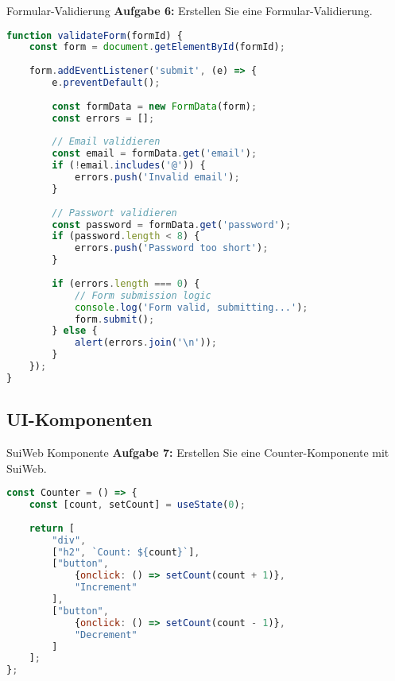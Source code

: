 \begin{example2}{Formular-Validierung}
    \textbf{Aufgabe 6:} Erstellen Sie eine Formular-Validierung.
    \begin{lstlisting}[language=JavaScript, style=basesmol]
function validateForm(formId) {
    const form = document.getElementById(formId);
    
    form.addEventListener('submit', (e) => {
        e.preventDefault();
        
        const formData = new FormData(form);
        const errors = [];
        
        // Email validieren
        const email = formData.get('email');
        if (!email.includes('@')) {
            errors.push('Invalid email');
        }
        
        // Passwort validieren
        const password = formData.get('password');
        if (password.length < 8) {
            errors.push('Password too short');
        }
        
        if (errors.length === 0) {
            // Form submission logic
            console.log('Form valid, submitting...');
            form.submit();
        } else {
            alert(errors.join('\n'));
        }
    });
}
    \end{lstlisting}
\end{example2}

\subsection{UI-Komponenten}

\begin{example2}{SuiWeb Komponente}
    \textbf{Aufgabe 7:} Erstellen Sie eine Counter-Komponente mit SuiWeb.
    \begin{lstlisting}[language=JavaScript, style=basesmol]
const Counter = () => {
    const [count, setCount] = useState(0);
    
    return [
        "div",
        ["h2", `Count: ${count}`],
        ["button", 
            {onclick: () => setCount(count + 1)},
            "Increment"
        ],
        ["button", 
            {onclick: () => setCount(count - 1)},
            "Decrement"
        ]
    ];
};
    \end{lstlisting}
\end{example2}

